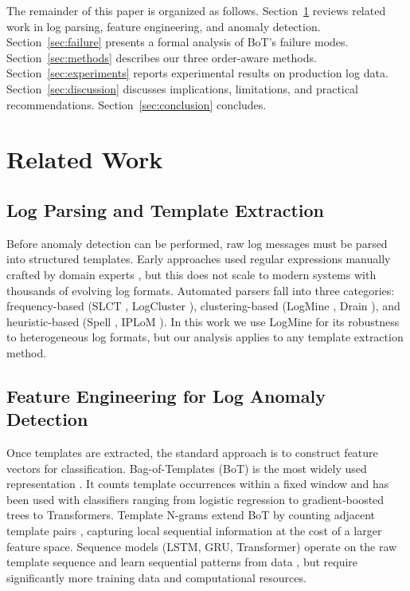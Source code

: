 \documentclass[11pt]{article}
\begin{document}
The remainder of this paper is organized as follows.
Section~\ref{sec:related} reviews related work in log parsing, feature engineering, and anomaly detection.
Section~\ref{sec:failure} presents a formal analysis of BoT's failure modes.
Section~\ref{sec:methods} describes our three order-aware methods.
Section~\ref{sec:experiments} reports experimental results on production log data.
Section~\ref{sec:discussion} discusses implications, limitations, and practical recommendations.
Section~\ref{sec:conclusion} concludes.

\section{Related Work}
\label{sec:related}

\subsection{Log Parsing and Template Extraction}

Before anomaly detection can be performed, raw log messages must be parsed into structured templates.
Early approaches used regular expressions manually crafted by domain experts \cite{odersky2004overview}, but this does not scale to modern systems with thousands of evolving log formats.
Automated parsers fall into three categories: 
frequency-based (SLCT \cite{vaarandi2003data}, LogCluster \cite{vaarandi2015logcluster}), 
clustering-based (LogMine \cite{hamooni2016logmine}, Drain \cite{he2017drain}), 
and heuristic-based (Spell \cite{du2016spell}, IPLoM \cite{makanju2012lightweight}).
In this work we use LogMine for its robustness to heterogeneous log formats, but our analysis applies to any template extraction method.

\subsection{Feature Engineering for Log Anomaly Detection}

Once templates are extracted, the standard approach is to construct feature vectors for classification.
Bag-of-Templates (BoT) is the most widely used representation \cite{du2017deeplog,zhang2019robust,guo2021logbert}.
It counts template occurrences within a fixed window and has been used with classifiers ranging from logistic regression to gradient-boosted trees to Transformers.
Template N-grams extend BoT by counting adjacent template pairs \cite{meng2019loganomaly}, capturing local sequential information at the cost of a larger feature space.
Sequence models (LSTM, GRU, Transformer) operate on the raw template sequence and learn sequential patterns from data \cite{du2017deeplog,meng2019loganomaly}, but require significantly more training data and computational resources.
\end{document}
